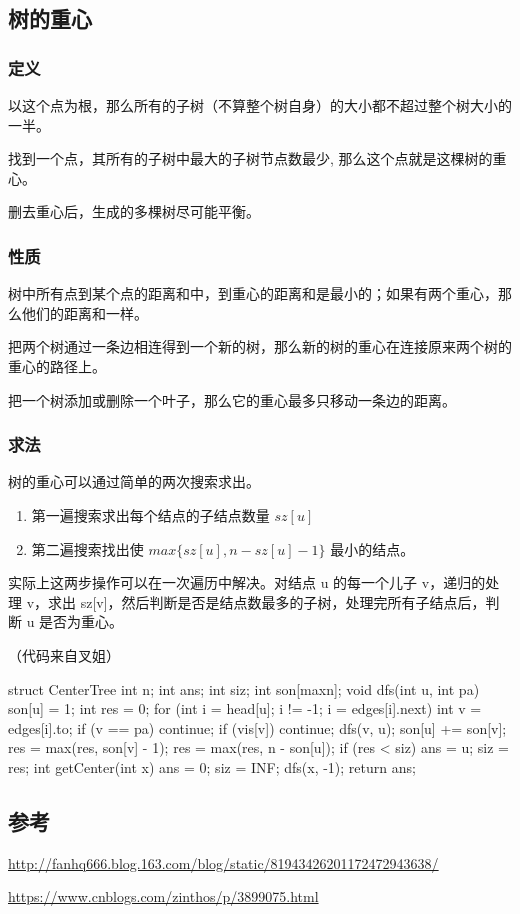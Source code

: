 
\subsection{树的重心}

\subsubsection{定义}

以这个点为根，那么所有的子树（不算整个树自身）的大小都不超过整个树大小的一半。

找到一个点，其所有的子树中最大的子树节点数最少, 那么这个点就是这棵树的重心。

删去重心后，生成的多棵树尽可能平衡。

\subsubsection{性质}

树中所有点到某个点的距离和中，到重心的距离和是最小的；如果有两个重心，那么他们的距离和一样。

把两个树通过一条边相连得到一个新的树，那么新的树的重心在连接原来两个树的重心的路径上。

把一个树添加或删除一个叶子，那么它的重心最多只移动一条边的距离。

\subsubsection{求法}

树的重心可以通过简单的两次搜索求出。

\begin{enumerate}
\item 第一遍搜索求出每个结点的子结点数量 $sz[u]$
\item 第二遍搜索找出使 $max\{sz[u],n-sz[u]-1\}$ 最小的结点。
\end{enumerate}

实际上这两步操作可以在一次遍历中解决。对结点 u 的每一个儿子 v，递归的处理 v，求出 sz[v]，然后判断是否是结点数最多的子树，处理完所有子结点后，判断 u 是否为重心。

（代码来自叉姐）

\begin{cppcode}
struct CenterTree {
  int n;
  int ans;
  int siz;
  int son[maxn];
  void dfs(int u, int pa) {
    son[u] = 1;
    int res = 0;
    for (int i = head[u]; i != -1; i = edges[i].next) {
      int v = edges[i].to;
      if (v == pa) continue;
      if (vis[v]) continue;
      dfs(v, u);
      son[u] += son[v];
      res = max(res, son[v] - 1);
    }
    res = max(res, n - son[u]);
    if (res < siz) {
      ans = u;
      siz = res;
    }
  }
  int getCenter(int x) {
    ans = 0;
    siz = INF;
    dfs(x, -1);
    return ans;
  }
}
\end{cppcode}

\subsection{参考}

\url{http://fanhq666.blog.163.com/blog/static/81943426201172472943638/}

\url{https://www.cnblogs.com/zinthos/p/3899075.html}
